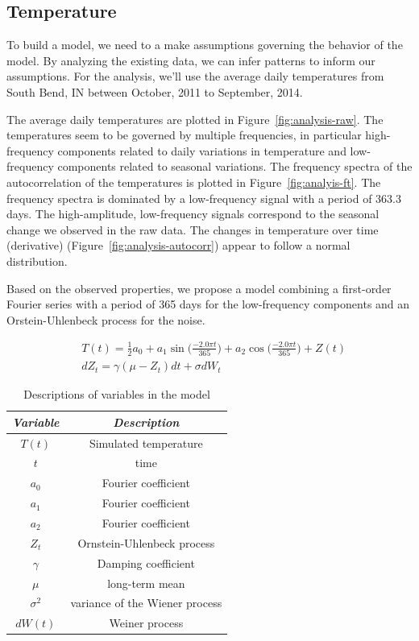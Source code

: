 \documentclass[11pt, letterpaper]{article}
\begin{document}
\subsection{Temperature}
To build a model, we need to a make assumptions governing the behavior of the model.  By analyzing the existing data, we can infer patterns to inform our assumptions.  For the analysis, we'll use the average daily temperatures from South Bend, IN between October, 2011 to September, 2014.

The average daily temperatures are plotted in Figure~\ref{fig:analysis-raw}. The temperatures seem to be governed by multiple frequencies, in particular high-frequency components related to daily variations in temperature and low-frequency components related to seasonal variations.   The frequency spectra of the autocorrelation of the temperatures is plotted in Figure~\ref{fig:analyis-ft}.  The frequency spectra is dominated by a low-frequency signal with a period of 363.3 days. The high-amplitude, low-frequency signals correspond to the seasonal change we observed in the raw data.  The changes in temperature over time (derivative) (Figure~\ref{fig:analysis-autocorr}) appear to follow a normal distribution.


Based on the observed properties, we propose a model combining a first-order Fourier series with a period of 365 days for the low-frequency components and an Orstein-Uhlenbeck process for the noise.

\begin{align}
&T(t) = \frac{1}{2} a_0 + a_1 \sin\Big(\frac{-2.0 \pi t}{365}\Big) + a_2 \cos\Big(\frac{-2.0 \pi t}{365}\Big) + Z(t) \\
&dZ_t = \gamma (\mu - Z_t)dt + \sigma dW_t
\end{align}

\begin{table}[H]
  \centering
  \begin{tabular}{c c} \hline
  \emph{Variable} & \emph{Description}\\ \hline
  $T(t)$ & Simulated temperature \\ \hline
  $t$ & time \\ \hline
  $a_0$ & Fourier coefficient \\ \hline
  $a_1$ & Fourier coefficient \\ \hline
  $a_2$ & Fourier coefficient \\ \hline
  $Z_t$ & Ornstein-Uhlenbeck process \\ \hline
  $\gamma$ & Damping coefficient\\ \hline
  $\mu$ & long-term mean \\ \hline
  $\sigma^2$ & variance of the Wiener process \\ \hline
  $dW(t)$ & Weiner process \\ \hline 
  \end{tabular}
  \caption{Descriptions of variables in the model}
  \label{tab:analysis-ft-values}
\end{table}
\end{document}
